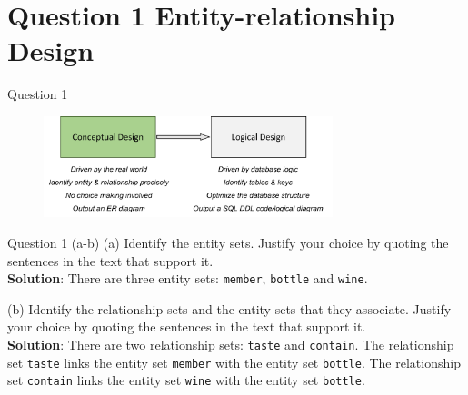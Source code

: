 \section*{Question 1 Entity-relationship Design}

\begin{frame}[fragile]{Question 1}
\begin{figure}
	\includegraphics[width=0.75\textwidth, trim=0 0 0 0, clip]{t4/images/step1.png}
\end{figure}
\end{frame}

\begin{frame}[fragile]{Question 1 (a-b)}
(a) Identify the entity sets. Justify your choice by quoting the sentences in the text that support it.\\ \vspace{5pt}
\textbf{Solution}: There are three entity sets: \texttt{member}, \texttt{bottle} and \texttt{wine}.\\ \vspace{10pt}

(b) Identify the relationship sets and the entity sets that they associate. Justify your choice by quoting the sentences in the text that support it.\\ \vspace{5pt}
\textbf{Solution}: There are two relationship sets: \texttt{taste} and \texttt{contain}. The relationship set \texttt{taste} links the entity set \texttt{member} with the entity set \texttt{bottle}. The relationship set \texttt{contain} links the entity set \texttt{wine} with the entity set \texttt{bottle}.
\end{frame}

